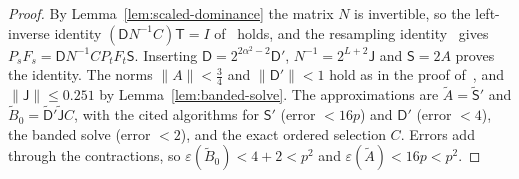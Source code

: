 \documentclass[11pt]{article}
\begin{document}
\begin{proof}
By Lemma~\ref{lem:scaled-dominance} the matrix $N$ is invertible, so the
left-inverse identity $(\mathsf DN^{-1}C)\mathsf T=I$
of~\cite[(4.2)]{HarveyHoeven2021} holds, and the resampling
identity~\cite[Theorem~4.2]{HarveyHoeven2021} gives
$P_sF_s=\mathsf DN^{-1}CP_tF_t\mathsf S$. Inserting
$\mathsf D=2^{2\alpha^2-2}\mathsf D'$, $N^{-1}=2^{L+2}\mathsf J$ and
$\mathsf S=2A$ proves the identity. The norms $\|A\|<\frac34$ and
$\|\mathsf D'\|<1$ hold as in the proof of~\cite[Proposition~4.7(i)]{HarveyHoeven2021},
and $\|\mathsf J\|\le0.251$ by Lemma~\ref{lem:banded-solve}. The
approximations are $\widetilde A=\widetilde{\mathsf S}'$ and
$\widetilde B_0=\widetilde{\mathsf D}'\widetilde{\mathsf J}C$, with the cited
algorithms for $\mathsf S'$ (error $<16p$) and $\mathsf D'$ (error $<4$), the
banded solve (error $<2$), and the exact ordered selection $C$. Errors add
through the contractions, so $\varepsilon(\widetilde B_0)<4+2<p^2$ and
$\varepsilon(\widetilde A)<16p<p^2$.


\end{proof}
\end{document}
